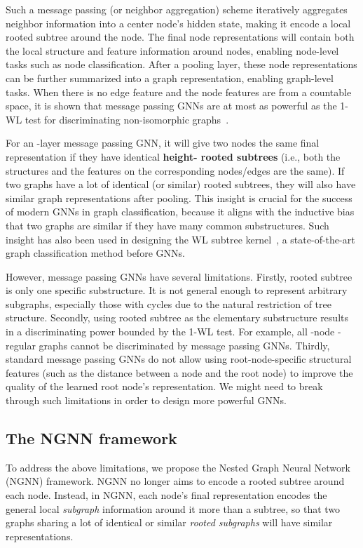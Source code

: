 \documentclass{article}
\begin{document}
Such a message passing (or neighbor aggregation) scheme iteratively aggregates neighbor information into a center node's hidden state, making it encode a local rooted subtree around the node. The final node representations will contain both the local structure and feature information around nodes, enabling node-level tasks such as node classification. After a pooling layer, these node representations can be further summarized into a graph representation, enabling graph-level tasks. When there is no edge feature and the node features are from a countable space, it is shown that message passing GNNs are at most as powerful as the 1-WL test for discriminating non-isomorphic graphs~\citep{xu2018powerful,morris2019weisfeiler}.

For an -layer message passing GNN, it will give two nodes the same final representation if they have identical \textbf{height- rooted subtrees} (i.e., both the structures and the features on the corresponding nodes/edges are the same). If two graphs have a lot of identical (or similar) rooted subtrees, they will also have similar graph representations after pooling. This insight is crucial for the success of modern GNNs in graph classification, because it aligns with the inductive bias that two graphs are similar if they have many common substructures. Such insight has also been used in designing the WL subtree kernel~\citep{shervashidze2011weisfeiler}, a state-of-the-art graph classification method before GNNs.

However, message passing GNNs have several limitations. Firstly, rooted subtree is only one specific substructure. It is not general enough to represent arbitrary subgraphs, especially those with cycles due to the natural restriction of tree structure. Secondly, using rooted subtree as the elementary substructure results in a discriminating power bounded by the 1-WL test. For example, all -node -regular graphs cannot be discriminated by message passing GNNs. Thirdly, standard message passing GNNs do not allow using root-node-specific structural features (such as the distance between a node and the root node) to improve the quality of the learned root node's representation. We might need to break through such limitations in order to design more powerful GNNs. 



\subsection{The NGNN framework}\label{section:ngnn}
To address the above limitations, we propose the Nested Graph Neural Network (NGNN) framework. NGNN no longer aims to encode a rooted subtree around each node. Instead, in NGNN, each node's final representation encodes the general local \emph{subgraph} information around it more than a subtree, so that two graphs sharing a lot of identical or similar \textit{rooted subgraphs} will have similar representations. 
\end{document}
